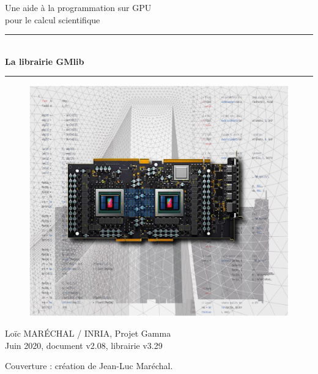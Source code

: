 \documentclass[a4paper,12pt]{article}
\newcommand{\HRule}{\rule{\linewidth}{1mm}}
\begin{document}
%
%

\begin{titlepage}

\begin{center}
\huge Une aide à la programmation sur GPU\\ pour le calcul scientifique
\HRule \\
\medskip
{\Huge \bfseries La librairie GMlib} \\
\HRule
\end{center}

\begin{figure}[htbp]
\begin{center}
\includegraphics[width=15cm]{gpu.jpg}
\end{center}
\end{figure}

\begin{flushright}
\Large Lo\"ic MAR\'ECHAL / INRIA, Projet Gamma \\
\normalsize Juin 2020, document v2.08, librairie v3.29
\end{flushright}

\end{titlepage}

\clearpage

\setcounter{tocdepth}{2}
\tableofcontents
\vfill

\footnotesize{Couverture : création de Jean-Luc Maréchal.}
\normalsize
\end{document}

